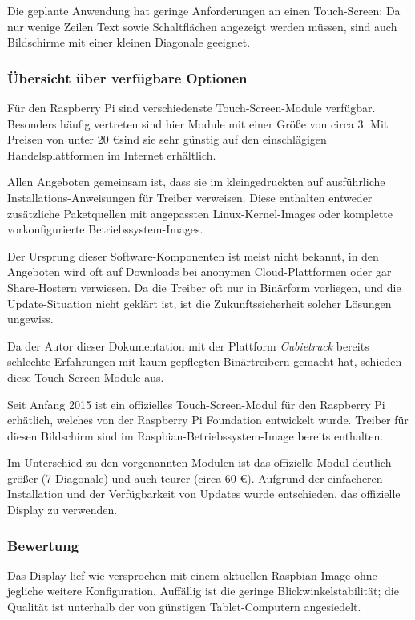 \documentclass[11pt,a4paper]{IEEEtran}
\begin{document}
Die geplante Anwendung hat geringe Anforderungen an einen Touch-Screen: Da nur
wenige Zeilen Text sowie Schaltflächen angezeigt werden müssen, sind auch
Bildschirme mit einer kleinen Diagonale geeignet.

\subsubsection{Übersicht über verfügbare Optionen}

Für den Raspberry Pi sind verschiedenste Touch-Screen-Module verfügbar.
Besonders häufig vertreten sind hier Module mit einer Größe von circa
\SI{3}{\inch}. Mit Preisen von unter 20 \euro sind sie sehr günstig auf den
einschlägigen Handelsplattformen im Internet erhältlich.

Allen Angeboten gemeinsam ist, dass sie im kleingedruckten auf ausführliche
Installations-Anweisungen für Treiber verweisen. Diese enthalten entweder
zusätzliche Paketquellen mit angepassten Linux-Kernel-Images oder komplette
vorkonfigurierte Betriebssystem-Images. 

Der Ursprung dieser Software-Komponenten ist meist nicht bekannt, in den
Angeboten wird oft auf Downloads bei anonymen Cloud-Plattformen oder gar
Share-Hostern verwiesen. Da die Treiber oft nur in Binärform vorliegen, und die
Update-Situation nicht geklärt ist, ist die Zukunftssicherheit solcher Lösungen
ungewiss.

Da der Autor dieser Dokumentation mit der Plattform \emph{Cubietruck} bereits
schlechte Erfahrungen mit kaum gepflegten Binärtreibern gemacht hat, schieden
diese Touch-Screen-Module aus.

Seit Anfang 2015 ist ein offizielles Touch-Screen-Modul für den Raspberry Pi
erhätlich, welches von der Raspberry Pi Foundation entwickelt wurde. Treiber
für diesen Bildschirm sind im Raspbian-Betriebssystem-Image bereits enthalten.

Im Unterschied zu den vorgenannten Modulen ist das offizielle Modul deutlich
größer (\SI{7}{\inch} Diagonale) und auch teurer (circa 60 \euro). Aufgrund der
einfacheren Installation und der Verfügbarkeit von Updates wurde entschieden,
das offizielle Display zu verwenden.

\subsubsection{Bewertung}

Das Display lief wie versprochen mit einem aktuellen Raspbian-Image ohne
jegliche weitere Konfiguration. Auffällig ist die geringe
Blickwinkelstabilität; die Qualität ist unterhalb der von günstigen
Tablet-Computern angesiedelt.
\end{document}
